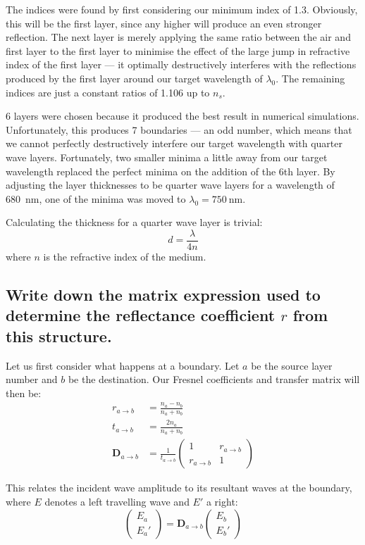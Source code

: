 \documentclass[a4paper]{scrartcl}
\begin{document}
The indices were found by first considering our minimum index of 1.3. Obviously, this will be the first layer, since any higher will produce an even stronger reflection. The next layer is merely applying the same ratio between the air and first layer to the first layer to minimise the effect of the large jump in refractive index of the first layer --- it optimally destructively interferes with the reflections produced by the first layer around our target wavelength of \(\lambda_0\). The remaining indices are just a constant ratios of 1.106 up to \(n_s\).

6 layers were chosen because it produced the best result in numerical simulations. Unfortunately, this produces 7 boundaries --- an odd number, which means that we cannot perfectly destructively interfere our target wavelength with quarter wave layers. Fortunately, two smaller minima a little away from our target wavelength replaced the perfect minima on the addition of the 6th layer. By adjusting the layer thicknesses to be quarter wave layers for a wavelength of \SI{680}{\nano\metre}, one of the minima was moved to \(\lambda_0 = \SI{750}{\nano\metre}\).

Calculating the thickness for a quarter wave layer is trivial:
\[d = \frac{\lambda}{4 n}\]
where \(n\) is the refractive index of the medium.

\subsection{Write down the matrix expression used to determine the reflectance coefficient \(r\) from this structure.}
Let us first consider what happens at a boundary. Let \(a\) be the source layer number and \(b\) be the destination. Our Fresnel coefficients and transfer matrix will then be:
\begin{align*}
    r_{a \rightarrow b} &= \frac{n_a - n_b}{n_a + n_b} \\
    t_{a \rightarrow b} &= \frac{2 n_a}{n_a + n_b} \\
    \mathbf{D}_{a \rightarrow b} &= \frac{1}{t_{a \rightarrow b}} \begin{pmatrix}
        1 & r_{a \rightarrow b} \\
        r_{a \rightarrow b} & 1
    \end{pmatrix}
\end{align*}

This relates the incident wave amplitude to its resultant waves at the boundary, where \(E\) denotes a left travelling wave and \(E'\) a right:
\[\begin{pmatrix}E_a \\ E_a'\end{pmatrix} = \mathbf{D}_{a \rightarrow b} \begin{pmatrix}E_b \\ E_b'\end{pmatrix}\]
\end{document}
